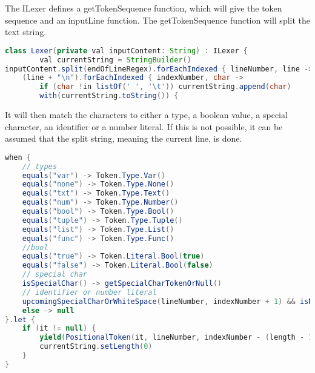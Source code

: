 The ILexer defines a getTokenSequence function, which will give the token sequence and an inputLine function.
The getTokenSequence function will split the text string.
\begin{lstlisting}[language=java,label=lis:LexerStringSplit,caption=The string is being split and new lines are added to the string .,firstnumber=8]
class Lexer(private val inputContent: String) : ILexer { 
        val currentString = StringBuilder()
inputContent.split(endOfLineRegex).forEachIndexed { lineNumber, line ->
	(line + "\n").forEachIndexed { indexNumber, char ->
		if (char !in listOf(' ', '\t')) currentString.append(char)
		with(currentString.toString()) {
\end{lstlisting}		
It will then match the characters to either a type, a boolean value, a special character, an identifier or a number literal.
If this is not possible, it can be assumed that the split string, meaning the current line, is done.
\begin{lstlisting}[language=java,label=lis:LexerStringMatcher,caption=The split string is being matched to a token,firstnumber=19]
when {
	// types
	equals("var") -> Token.Type.Var()
	equals("none") -> Token.Type.None()
	equals("txt") -> Token.Type.Text()
	equals("num") -> Token.Type.Number()
	equals("bool") -> Token.Type.Bool()
	equals("tuple") -> Token.Type.Tuple()
	equals("list") -> Token.Type.List()
	equals("func") -> Token.Type.Func()
	//bool
	equals("true") -> Token.Literal.Bool(true)
	equals("false") -> Token.Literal.Bool(false)
	// special char
	isSpecialChar() -> getSpecialCharTokenOrNull()
	// identifier or number literal
	upcomingSpecialCharOrWhiteSpace(lineNumber, indexNumber + 1) && isNotEmpty() -> getLiteralOrIdentifier()
	else -> null
}.let {
	if (it != null) {
		yield(PositionalToken(it, lineNumber, indexNumber - (length - 1)))
		currentString.setLength(0)
	}
}
\end{lstlisting}

